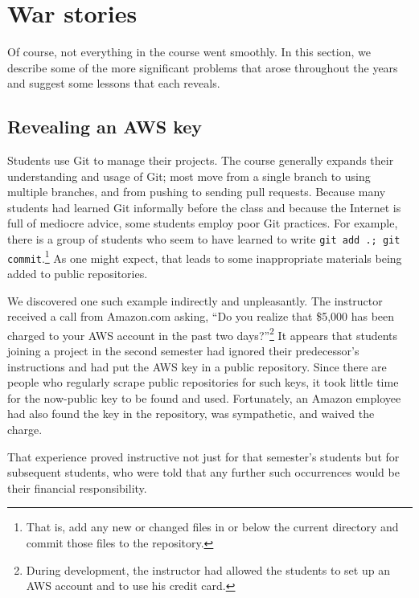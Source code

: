 \section{War stories}

Of course, not everything in the course went smoothly.  In this section,
we describe some of the more significant problems that arose throughout
the years and suggest some lessons that each reveals.

\subsection{Revealing an AWS key}

Students use Git to manage their projects.  The course
generally expands their understanding and usage of Git; most move
from a single branch to using multiple branches, and from pushing
to sending pull requests.  Because many students had learned Git
informally before the class and because the Internet is full of
mediocre advice, some students employ poor Git practices.
For example, there is a group of students who seem to have learned
to write \texttt{git add .; git commit}.\footnote{That is, add any
new or changed files in or below the current directory and commit
those files to the repository.}  As one might expect, that leads
to some inappropriate materials being added to public repositories.

We discovered one such example indirectly and unpleasantly.  The
instructor received a call from Amazon.com asking,
``Do you realize that \$5,000 has been charged to your AWS
account in the past two days?''\footnote{During development, the
instructor had allowed the students to set up an AWS account and
to use his credit card.}  It appears that students joining a project
in the second semester had ignored their predecessor's instructions
and had put the AWS key in a public repository.  Since
there are people who regularly scrape public repositories for such
keys, it took little time for the now-public key to be found and
used.  Fortunately, an Amazon employee had also found the
key in the repository, was sympathetic, and waived the charge.

That experience proved instructive not just for that semester's
students but for subsequent students, who were told that any
further such occurrences would be their financial responsibility.

